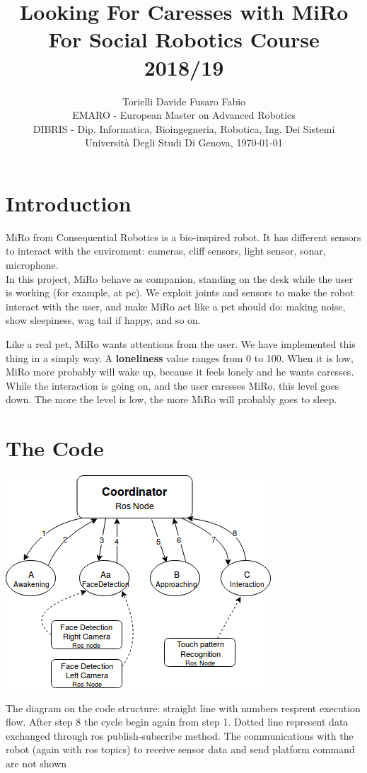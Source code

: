 \documentclass[12pt,peerreviewca, a4paper, onecolumn]{IEEEtran}
\title{\LARGE\textbf{Looking For Caresses with MiRo}\\\large For Social Robotics Course 2018/19}
\author{\large{Torielli Davide \quad Fusaro Fabio} \\
	\small EMARO - European Master on Advanced Robotics\\
	\small DIBRIS - Dip. Informatica, Bioingegneria, Robotica, Ing. Dei Sistemi\\
	\small Universit\`{a} Degli Studi Di Genova, \today}
\begin{document}
	\maketitle
	
	\section{{\large Introduction}}
	MiRo from Consequential Robotics is a bio-inspired robot. It has different sensors to interact with the enviroment: cameras, cliff sensors, light sensor, sonar, microphone.\\
	In this project, MiRo behave as companion, standing on the desk while the user is working (for example, at pc). We exploit joints and sensors to make the robot interact with the user, and make MiRo act like a pet should do: making noise, show sleepiness, wag tail if happy, and so on.	
	
	Like a real pet, MiRo wants attentions from the user. We have implemented this thing in a simply way. A \textbf{loneliness} value ranges from 0 to 100. When it is low, MiRo more probably will wake up, because it feels lonely and he wants caresses. While the interaction is going on, and the user caresses  MiRo, this level goes down. The more the level is low, the more MiRo will probably goes to sleep.
	
	\section{The Code}
	\begin{center}
		\includegraphics[scale=0.5]{diagram}
	\end{center}
	{\small The diagram on the code structure: straight line with numbers resprent execution flow. After step 8 the cycle begin again from step 1. Dotted line represent data exchanged through ros publish-subscribe method.  The communications with the robot (again with ros topics) to receive sensor data and send platform command are not shown}\\
\end{document}
